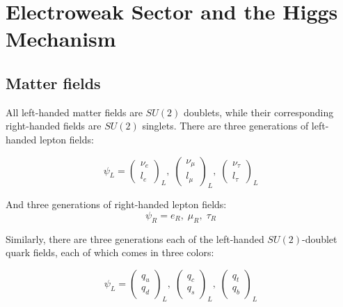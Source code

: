 \section{Electroweak Sector and the Higgs Mechanism}\label{sec:sm_ew}

\subsection{Matter fields}\label{subsec:ew_fields}

All left-handed matter fields are $SU(2)$ doublets, while their corresponding right-handed fields are $SU(2)$ singlets.
There are three generations of left-handed lepton fields:

\begin{equation}\label{eq:left_handed_leptons}
    \psi_L =
    \begin{pmatrix}
        \nu_e \\ l_e
    \end{pmatrix}_L,\;
    \begin{pmatrix}
        \nu_{\mu} \\ l_{\mu}
    \end{pmatrix}_L,\;
     \begin{pmatrix}
        \nu_{\tau} \\ l_{\tau}
    \end{pmatrix}_L
\end{equation}

And three generations of right-handed lepton fields:
\begin{equation}\label{eq:right_handed_leptons}
\psi_R = e_R,\; \mu_R,\; \tau_R
\end{equation}

Similarly, there are three generations each of the left-handed $SU(2)$-doublet quark fields,
each of which comes in three colors:

\begin{equation}\label{eq:left_handed_quarks}
   \psi_L =
    \begin{pmatrix}
        q_u \\ q_d
    \end{pmatrix}_L,\;
    \begin{pmatrix}
        q_{c} \\ q_{s}
    \end{pmatrix}_L,\;
     \begin{pmatrix}
        q_{t} \\ q_{b}
    \end{pmatrix}_L
\end{equation}

